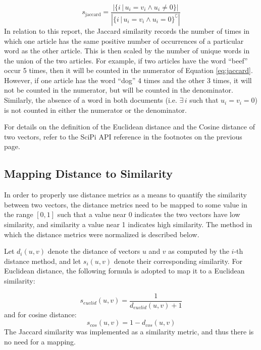 \documentclass[11pt]{article}
\begin{document}
\begin{equation} \label{eq:jaccard}
	s_{\text{jaccard}} = \frac{ \left| \{i \, | \, u_i = v_i \land u_i \ne 0 \} \right| }
	                          { \left| \{i \, | \, u_i = v_i \land u_i = 0 \}^\complement \right| }
\end{equation}
In relation to this report, the Jaccard similarity records the number of times in which one article has the same positive number of occurrences of a particular word as the other article.
This is then scaled by the number of unique words in the union of the two articles. For example, if two articles have the word ``beef'' occur 5 times, then it will be counted in the numerator of Equation \ref{eq:jaccard}.
However, if one article has the word ``dog'' 4 times and the other 3 times, it will not be counted in the numerator, but will be counted in the denominator.
Similarly, the absence of a word in both documents (i.e. $\exists \, i$ such that $u_i = v_i = 0$) is not counted in either the numerator or the denominator.

For details on the definition of the Euclidean distance and the Cosine distance of two vectors, refer to the SciPi API reference in the footnotes on the previous page.

\subsection{Mapping Distance to Similarity} \label{sec:mapping}

In order to properly use distance metrics as a means to quantify the similarity between two vectors, the distance metrics need to be mapped to some value in the range $[0, 1]$ such that a value near 0 indicates the two vectors have low similarity, and similarity a value near 1 indicates high similarity.
The method in which the distance metrics were normalized is described below.

Let $d_i(u, v)$ denote the distance of vectors $u$ and $v$ as computed by the $i$-th distance method, and let $s_i(u, v)$ denote their corresponding similarity.
For Euclidean distance, the following formula is adopted to map it to a Euclidean similarity:

\begin{equation} \label{eq:euclid}
s_{euclid}(u, v) = \frac{1}{d_{euclid}(u, v) + 1}
\end{equation}
and for cosine distance:
\begin{equation} \label{eq:cosine}
s_{cos}(u, v) = 1 - d_{cos}(u, v)
\end{equation}
The Jaccard similarity was implemented as a similarity metric, and thus there is no need for a mapping.
\end{document}
